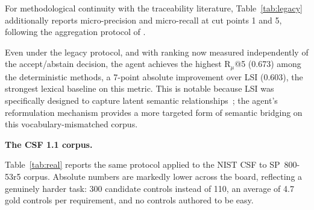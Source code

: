 \documentclass[smallextended,natbib]{svjour3}
\begin{document}
For methodological continuity with the traceability literature, Table~\ref{tab:legacy} additionally reports micro-precision and micro-recall at cut points 1 and 5, following the aggregation protocol of \citet{MarcusMaletic2003}.

\begin{table}[htbp]
\caption{Legacy micro-precision/recall at cut points on the diagnostic benchmark. Repeated-holdout protocol, 30 seeds; descriptive.}
\label{tab:legacy}
\centering
\setlength{\tabcolsep}{3pt}
\small
{}
\end{table}

Even under the legacy protocol, and with ranking now measured independently of the accept/abstain decision, the agent achieves the highest $\text{R}_\mu$@5 (0.673) among the deterministic methods, a 7-point absolute improvement over LSI (0.603), the strongest lexical baseline on this metric.
This is notable because LSI was specifically designed to capture latent semantic relationships~\citep{MarcusMaletic2003}; the agent's reformulation mechanism provides a more targeted form of semantic bridging on this vocabulary-mismatched corpus.


\noindent\textbf{The CSF 1.1 corpus.}
\label{sec:results-real}

Table~\ref{tab:real} reports the same protocol applied to the NIST CSF to SP~800-53r5 corpus.
Absolute numbers are markedly lower across the board, reflecting a genuinely harder task: 300 candidate controls instead of 110, an average of 4.7 gold controls per requirement, and no controls authored to be easy.
\end{document}
